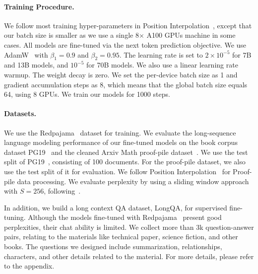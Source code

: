 \documentclass{article} %
\begin{document}
\paragraph{Training Procedure.}
We follow most training hyper-parameters in Position Interpolation~\citep{position-interpolation}, except that our batch size is smaller as we use a single 8$\times$ A100 GPUs machine in some cases. All models are fine-tuned via the next token prediction objective. We use AdamW~\citep{adamw} with $\beta_1 = 0.9$ and $\beta_2 = 0.95$. The learning rate is set to $2\times 10^{-5}$ for 7B and 13B models, and $10^{-5}$ for 70B models. We also use a linear learning rate warmup. The weight decay is zero. We set the per-device batch size as 1 and gradient accumulation steps as 8, which means that the global batch size equals 64, using 8 GPUs. We train our models for 1000 steps.

\paragraph{Datasets.}
We use the Redpajama~\citep{together2023redpajama} dataset for training.
We evaluate the long-sequence language modeling performance of our fine-tuned models on the book corpus dataset PG19~\citep{pg19} and the cleaned Arxiv Math proof-pile dataset~\citep{proof-pile}. We use the test split of PG19~\citep{pg19}, consisting of 100 documents. For the proof-pile dataset, we also use the test split of it for evaluation. We follow Position Interpolation~\citep{position-interpolation} for Proof-pile data processing. We evaluate perplexity by using a sliding window approach with $S=256$, following~\citep{alibi}.

In addition, we build a long context QA dataset, LongQA, for supervised fine-tuning. Although the models fine-tuned with Redpajama~\citep{together2023redpajama} present good perplexities, their chat ability is limited. We collect more than 3k question-answer pairs, relating to the materials like technical paper, science fiction, and other books. The questions we designed include summarization, relationships, characters, and other details related to the material. For more details, please refer to the appendix.
\end{document}
